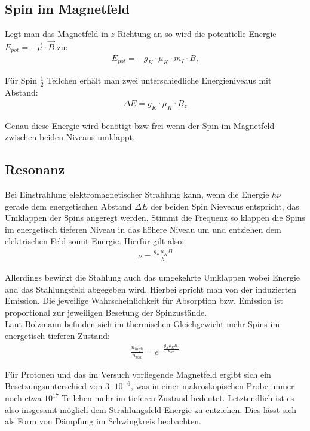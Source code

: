 \documentclass[12pt]{article}
\begin{document}
\subsection{Spin im Magnetfeld}
Legt man das Magnetfeld in $z$-Richtung an so wird die potentielle Energie $E_{pot} = -\vec\mu \cdot \vec B$ zu:
\begin{align}
 E_{pot} = -g_K \cdot \mu_K \cdot m_I \cdot B_z
\end{align}

Für Spin $\frac{1}{2}$ Teilchen erhält man zwei unterschiedliche Energieniveaus mit Abstand:
\begin{align}
 \Delta E = g_K \cdot \mu_K \cdot B_z
\end{align}

Genau diese Energie wird benötigt bzw frei wenn der Spin im Magnetfeld zwischen beiden Niveaus umklappt.

\subsection{Resonanz}
Bei Einstrahlung elektromagnetischer Strahlung kann, wenn die Energie $h\nu$ gerade dem energetischen Abstand $\Delta E$ der beiden Spin Nieveaus entspricht, das Umklappen der Spins angeregt werden. Stimmt die Frequenz so klappen die Spins im energetisch tieferen Niveau in das höhere Niveau um und entziehen dem elektrischen Feld somit Energie. Hierfür gilt also:
\begin{align}
 \nu = \frac{g_K \mu_K B}{h}
\label{resfreq}
\end{align}


 Allerdings bewirkt die Stahlung auch das umgekehrte Umklappen wobei Energie and das Stahlungsfeld abgegeben wird. Hierbei spricht man von der induzierten Emission. Die jeweilige Wahrscheinlichkeit für Absorption bzw. Emission ist proportional zur jeweiligen Besetung der Spinzustände.\\

Laut Bolzmann befinden sich im thermischen Gleichgewicht mehr Spins im energetisch tieferen Zustand:
\begin{align}
 \frac{n_{high}}{n_{low}} = e^{-\frac{g_K \mu_K B_z}{k_B T}} 
\end{align}

Für Protonen und das im Versuch vorliegende Magnetfeld ergibt sich ein Besetzungsunterschied von $3\cdot 10^{-6}$, was in einer makroskopischen Probe immer noch etwa $10^{17}$ Teilchen mehr im tieferen Zustand bedeutet. Letztendlich ist es also insgesamt möglich dem Strahlungsfeld Energie zu entziehen. Dies lässt sich als Form von Dämpfung im Schwingkreis beobachten.
\end{document}
